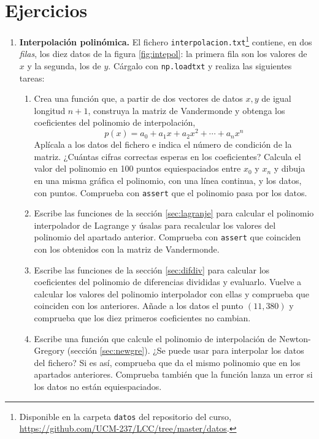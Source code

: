 \section{Ejercicios}
\begin{enumerate}
\item \textbf{Interpolación polinómica.} El fichero \texttt{interpolacion.txt}\footnote{Disponible en la carpeta \texttt{datos} del repositorio del curso, \url{https://github.com/UCM-237/LCC/tree/master/datos}.} contiene, en dos \emph{filas}, los diez datos de la figura \ref{fig:intepol}: la primera fila son los valores de $x$ y la segunda, los de $y$. Cárgalo con \texttt{np.loadtxt} y realiza las siguientes tareas:
\begin{enumerate}
\item \label{ej:vander} Crea una función que, a partir de dos vectores de datos $x,y$ de igual longitud $n+1$, construya la matriz de Vandermonde y obtenga los coeficientes del polinomio de interpolación,
\begin{equation*}
p(x)=a_0+a_1x+a_2x^2+\cdots+a_nx^n
\end{equation*}
Aplícala a los datos del fichero e indica el número de condición de la matriz. ¿Cuántas cifras correctas esperas en los coeficientes? Calcula el valor del polinomio en 100 puntos equiespaciados entre $x_0$ y $x_n$ y dibuja en una misma gráfica el polinomio, con una línea continua, y los datos, con puntos. Comprueba con \texttt{assert} que el polinomio pasa por los datos.

\item \label{ej:lagrange} Escribe las funciones de la sección \ref{sec:lagranje} para calcular el polinomio interpolador de Lagrange y úsalas para recalcular los valores del polinomio del apartado anterior. Comprueba con \texttt{assert} que coinciden con los obtenidos con la matriz de Vandermonde.

\item \label{ej:difdiv} Escribe las funciones de la sección \ref{sec:difdiv} para calcular los coeficientes del polinomio de diferencias divididas y evaluarlo. Vuelve a calcular los valores del polinomio interpolador con ellas y comprueba que coinciden con los anteriores. Añade a los datos el punto $(11, 380)$ y comprueba que los diez primeros coeficientes no cambian.

\item \label{ej:newgre} Escribe una función que calcule el polinomio de interpolación de Newton-Gregory (sección \ref{sec:newgre}). ¿Se puede usar para interpolar los datos del fichero? Si es así, comprueba que da el mismo polinomio que en los apartados anteriores. Comprueba también que la función lanza un error si los datos no están equiespaciados.


\end{enumerate}
\end{enumerate}
